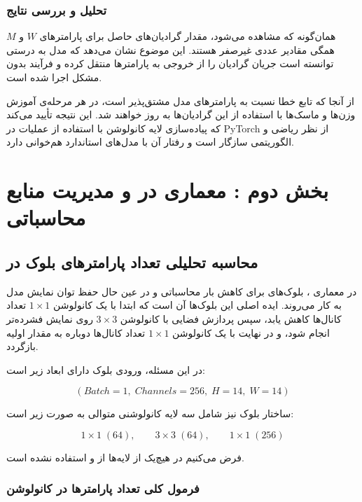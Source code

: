 \documentclass{article}
\begin{document}
\subsubsection{تحلیل و بررسی نتایج}

همان‌گونه که مشاهده می‌شود، مقدار گرادیان‌های حاصل برای پارامترهای $W$ و $M$ همگی مقادیر عددی غیرصفر هستند.  
این موضوع نشان می‌دهد که مدل به درستی توانسته است جریان گرادیان را از خروجی به پارامترها منتقل کرده و فرآیند  بدون مشکل اجرا شده است.

از آنجا که تابع خطا  نسبت به پارامترهای مدل مشتق‌پذیر است، در هر مرحله‌ی آموزش وزن‌ها و ماسک‌ها با استفاده از این گرادیان‌ها به روز خواهند شد. این نتیجه تأیید می‌کند که پیاده‌سازی لایه کانولوشن با استفاده از عملیات  در PyTorch از نظر ریاضی و الگوریتمی سازگار است و رفتار آن با مدل‌های استاندارد  هم‌خوانی دارد.
\newpage

\section{بخش دوم : معماری  در  و مدیریت منابع محاسباتی}
\subsection{محاسبه تحلیلی تعداد پارامترهای بلوک  در }

در معماری ، بلوک‌های  برای کاهش بار محاسباتی و در عین حال حفظ توان نمایش مدل به کار می‌روند. ایده اصلی این بلوک‌ها آن است که ابتدا با یک کانولوشن \(1\times1\) تعداد کانال‌ها کاهش یابد، سپس پردازش فضایی با کانولوشن \(3\times3\) روی نمایش فشرده‌تر انجام شود، و در نهایت با یک کانولوشن \(1\times1\) تعداد کانال‌ها دوباره به مقدار اولیه بازگردد.

در این مسئله، ورودی بلوک دارای ابعاد زیر است:

\[
(Batch=1,\; Channels=256,\; H=14,\; W=14)
\]

ساختار بلوک نیز شامل سه لایه کانولوشنی متوالی به صورت زیر است:

\[
1\times1 \; (64), \qquad 3\times3 \; (64), \qquad 1\times1 \; (256)
\]

فرض می‌کنیم در هیچ‌یک از لایه‌ها از  و  استفاده نشده است.

\subsubsection{فرمول کلی تعداد پارامترها در کانولوشن}
\end{document}
